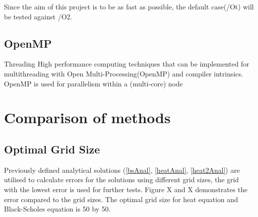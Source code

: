 \documentclass[12pt, oneside]{book}
\theoremstyle{plain}
\theoremstyle{definition}
\begin{document}
Since the aim of this project is to be as fast as possible, the default case(/Ot) will be tested against /O2.

\subsection{OpenMP}
Threading
High performance computing techniques that can be implemented for multithreading with Open Multi-Processing(OpenMP) and compiler intrinsics.
OpenMP is used for parallelism within a (multi-core) node 
\section{Comparison of methods}
\subsection{Optimal Grid Size}
Previously defined analytical solutions (\ref{bsAnal}, \ref{heatAnal}, \ref{heat2Anal}) are utilised to calculate errors for the solutions using different grid sizes, the grid with the lowest error is used for further tests. Figure X and X demonstrates the error compared to the grid sizes. The optimal grid size for heat equation and Black-Scholes equation is 50 by 50.
\end{document}
